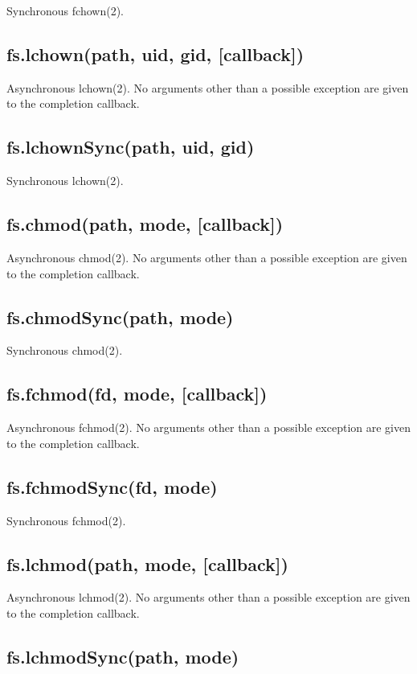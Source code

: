 Synchronous fchown(2).

\subsection{fs.lchown(path, uid, gid, {[}callback{]})}

Asynchronous lchown(2). No arguments other than a possible exception are
given to the completion callback.

\subsection{fs.lchownSync(path, uid, gid)}

Synchronous lchown(2).

\subsection{fs.chmod(path, mode, {[}callback{]})}

Asynchronous chmod(2). No arguments other than a possible exception are
given to the completion callback.

\subsection{fs.chmodSync(path, mode)}

Synchronous chmod(2).

\subsection{fs.fchmod(fd, mode, {[}callback{]})}

Asynchronous fchmod(2). No arguments other than a possible exception are
given to the completion callback.

\subsection{fs.fchmodSync(fd, mode)}

Synchronous fchmod(2).

\subsection{fs.lchmod(path, mode, {[}callback{]})}

Asynchronous lchmod(2). No arguments other than a possible exception are
given to the completion callback.

\subsection{fs.lchmodSync(path, mode)}

